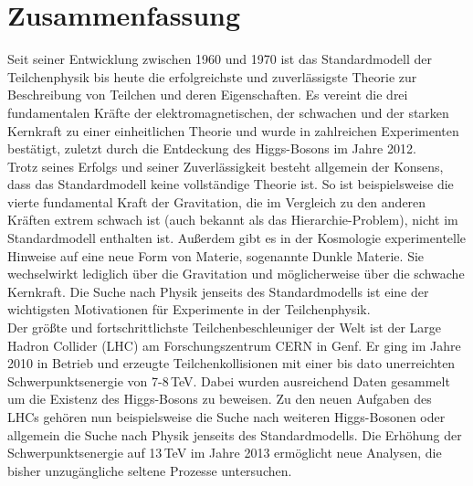 \chapter*{Zusammenfassung}
Seit seiner Entwicklung zwischen 1960 und 1970 ist das Standardmodell der Teilchenphysik bis heute die erfolgreichste und zuverlässigste Theorie zur Beschreibung von Teilchen und deren Eigenschaften. Es vereint die drei fundamentalen Kräfte der elektromagnetischen, der schwachen und der starken Kernkraft zu einer einheitlichen Theorie und wurde in zahlreichen Experimenten bestätigt, zuletzt durch die Entdeckung des Higgs-Bosons im Jahre 2012.\\

Trotz seines Erfolgs und seiner Zuverl\"assigkeit besteht allgemein der Konsens, dass das Standardmodell keine vollständige Theorie ist. So ist beispielsweise die vierte fundamental Kraft der Gravitation, die im Vergleich zu den anderen Kräften extrem schwach ist (auch bekannt als das Hierarchie-Problem), nicht im Standardmodell enthalten ist. Außerdem gibt es in der Kosmologie experimentelle Hinweise auf eine neue Form von Materie, sogenannte Dunkle Materie. Sie wechselwirkt lediglich über die Gravitation und möglicherweise über die schwache Kernkraft. Die Suche nach Physik jenseits des Standardmodells ist eine der wichtigsten Motivationen für Experimente in der Teilchenphysik.\\

Der größte und fortschrittlichste Teilchenbeschleuniger der Welt ist der Large Hadron Collider (LHC) am Forschungszentrum CERN in Genf. Er ging im Jahre 2010 in Betrieb und erzeugte Teilchenkollisionen mit einer bis dato unerreichten Schwerpunktsenergie von 7-8\,TeV. Dabei wurden ausreichend Daten gesammelt um die Existenz des Higgs-Bosons zu beweisen. Zu den neuen Aufgaben des LHCs gehören nun beispielsweise die Suche nach weiteren Higgs-Bosonen oder allgemein die Suche nach Physik jenseits des Standardmodells. Die Erhöhung der Schwerpunktsenergie auf 13\,TeV im Jahre 2013 ermöglicht neue Analysen, die bisher unzugängliche seltene Prozesse untersuchen.\\

